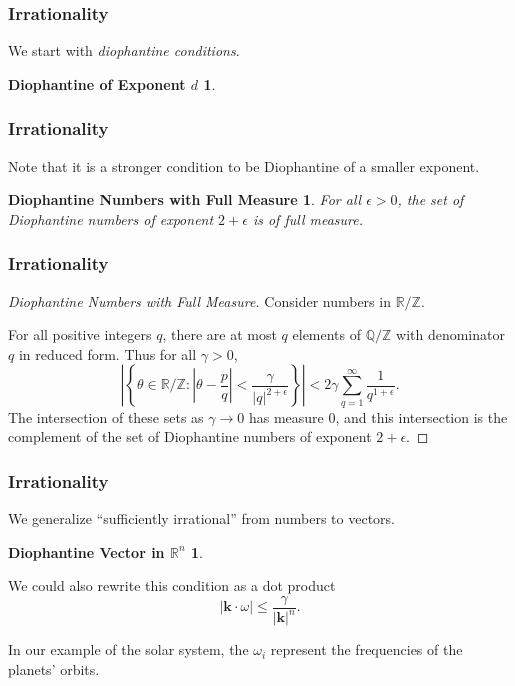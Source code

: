 \documentclass{beamer}
\newcommand{\Z}{\mathbb{Z}}
\newcommand{\Q}{\mathbb{Q}}
\newcommand{\R}{\mathbb{R}}
\newcommand{\bp}[1]{\bm{#1}}
\begin{document}
\begin{frame}
  \frametitle{Irrationality}
  We start with \emph{diophantine conditions}.
  \newtheorem{dionum}{Diophantine of Exponent $d$}
  \begin{dionum}
    \dionumber{}
  \end{dionum}
\end{frame}

\begin{frame}
  \frametitle{Irrationality}
  Note that it is a stronger condition to be Diophantine of a smaller exponent.
  
  \newtheorem{diomany}{Diophantine Numbers with Full Measure}
  \begin{diomany}
    For all $\epsilon > 0$, the set of Diophantine numbers of exponent $2 +
    \epsilon$ is of full measure.
  \end{diomany}
\end{frame}

\begin{frame}
  \frametitle{Irrationality}
  \begin{proof}[Diophantine Numbers with Full Measure]
    Consider numbers in $\R / \Z$.

    For all positive integers $q$, there are at most $q$ elements of $\Q / \Z$
    with denominator $q$ in reduced form.
    Thus for all $\gamma > 0$,
    \begin{equation*}
      \left|\left\{ \theta \in \R / \Z : \left| \theta - \frac{p}{q} \right| <
          \frac{\gamma}{|q|^{2 + \epsilon}} \right\} \right| < 2 \gamma \sum_{q =
      1}^{\infty} \frac{1}{q^{1 + \epsilon}}.
  \end{equation*}
  The intersection of these sets as $\gamma \to 0$ has measure $0$, and this
  intersection is the complement of the set of Diophantine numbers of exponent
  $2 + \epsilon$.
  \end{proof}
\end{frame}

\begin{frame}
  \frametitle{Irrationality}
  We generalize ``sufficiently irrational'' from numbers to vectors.
  \newtheorem{diovec}{Diophantine Vector in $\mathbb{R}^n$}
  \begin{diovec}
    \diovector{}
  \end{diovec}

  We could also rewrite this condition as a dot product
  \begin{equation*}
    |\bp{k} \cdot \omega| \leq \frac{\gamma}{|\bp{k}|^n}.
  \end{equation*}

  In our example of the solar system, the $\omega_i$ represent the
  frequencies of the planets' orbits.
\end{frame}
\end{document}
